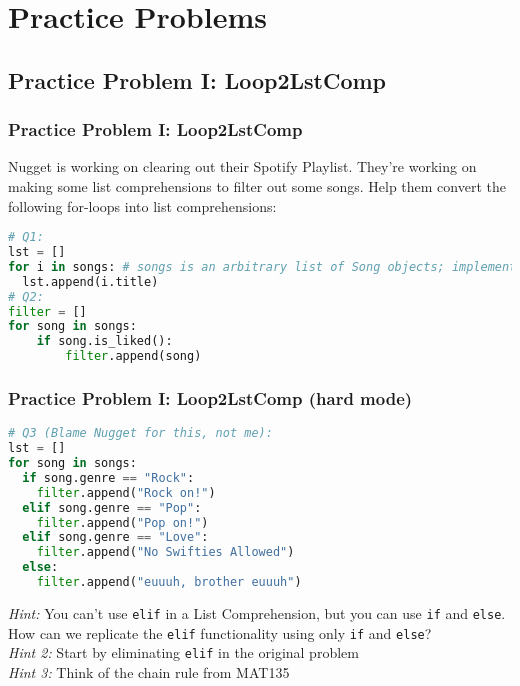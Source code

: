 \documentclass[hyperref={colorlinks,citecolor=blue,linkcolor=blue,urlcolor=blue}]{beamer}
\begin{document}
\section{Practice Problems}
\subsection{Practice Problem I: Loop2LstComp}
\begin{frame}[fragile]
  
  \frametitle{Practice Problem I: Loop2LstComp}

  Nugget is working on clearing out their Spotify Playlist. They're working on making some list comprehensions to filter out some songs. Help them convert the following for-loops into list comprehensions:
  \begin{lstlisting}[language=Python, style=mystyle]
# Q1: 
lst = []
for i in songs: # songs is an arbitrary list of Song objects; implementation is irrelevant for this question 
  lst.append(i.title)
# Q2:
filter = []
for song in songs:
    if song.is_liked():
        filter.append(song)
\end{lstlisting}

\end{frame}

\begin{frame}[fragile]
  \frametitle{Practice Problem I: Loop2LstComp (hard mode)}
  \begin{lstlisting}[language=Python, style=mystyle]
# Q3 (Blame Nugget for this, not me):
lst = []
for song in songs:
  if song.genre == "Rock":
    filter.append("Rock on!")
  elif song.genre == "Pop":
    filter.append("Pop on!")
  elif song.genre == "Love":
    filter.append("No Swifties Allowed")
  else:
    filter.append("euuuh, brother euuuh")
    \end{lstlisting}
\textit{Hint:} You can't use \texttt{elif} in a List Comprehension, but you can use \texttt{if} and \texttt{else}. How can we replicate the \texttt{elif} functionality using only \texttt{if} and \texttt{else}?\\
\textit{Hint 2:} Start by eliminating \texttt{elif} in the original problem\\
\textit{Hint 3:} Think of the chain rule from MAT135
\end{frame}
\end{document}
